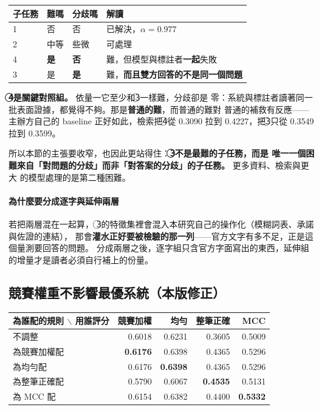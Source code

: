 \documentclass[11pt,a4paper]{ctexart}
\begin{document}
\begin{tcolorbox}[colback=green!5, colframe=green!45, title=兩個量測的是不同的東西，分開來比合在一起有用]
\begin{tabular}{@{}llll@{}}
\toprule
子任務 & 難嗎 & 分歧嗎 & 解讀 \\
\midrule
\textcircled{1} & 否 & 否 & 已解決，$\alpha=0.977$ \\
\textcircled{2} & 中等 & 些微 & 可處理 \\
\textcircled{4} & \textbf{是} & \textbf{否} & 難，但模型與標註者\textbf{一起}失敗 \\
\rowcolor{yellow!15}
\textcircled{3} & 是 & \textbf{是} & 難，\textbf{而且雙方回答的不是同一個問題} \\
\bottomrule
\end{tabular}

\medskip
\textbf{\textcircled{4}是關鍵對照組。} 依量一它至少和\textcircled{3}一樣難，分歧卻是
零：系統與標註者讀著同一批表面證據，都覺得不夠。那是\textbf{普通的難}，而普通的難對
普通的補救有反應——主辦方自己的 baseline 正好如此，檢索把\textcircled{4}從 0.3090 拉到
0.4227，把\textcircled{3}只從 0.3549 拉到 0.3599。

\medskip
所以本節的主張要收窄，也因此更站得住：\textbf{\textcircled{3}不是最難的子任務，而是
唯一一個困難來自「對問題的分歧」而非「對答案的分歧」的子任務。} 更多資料、檢索與更大
的模型處理的是第二種困難。
\end{tcolorbox}

\paragraph{為什麼要分成逐字與延伸兩層} 若把兩層混在一起算，
\textcircled{3}的特徵集裡會混入本研究自己的操作化（模糊詞表、承諾與佐證的連結），
那會\textbf{灌水正好要被檢驗的那一列}——官方文字有多不足，正是這個量測要回答的問題。
分成兩層之後，逐字組只含官方字面寫出的東西，延伸組的增量才是讀者必須自行補上的份量。

\subsection{競賽權重不影響最優系統（本版修正）}
\label{sec:weights}

\begin{table}[h]
\centering\small
\begin{tabular}{@{}lrrrr@{}}
\toprule
為誰配的規則 $\backslash$ 用誰評分 & 競賽加權 & 均勻 & 整筆正確 & MCC \\
\midrule
不調整 & 0.6018 & 0.6231 & 0.3605 & 0.5009 \\
為競賽加權配 & \textbf{0.6176} & 0.6398 & 0.4365 & 0.5296 \\
為均勻配 & 0.6176 & \textbf{0.6398} & 0.4365 & 0.5296 \\
為整筆正確配 & 0.5790 & 0.6067 & \textbf{0.4535} & 0.5131 \\
為 MCC 配 & 0.6154 & 0.6382 & 0.4400 & \textbf{0.5332} \\
\bottomrule
\end{tabular}
\end{table}
\end{document}
